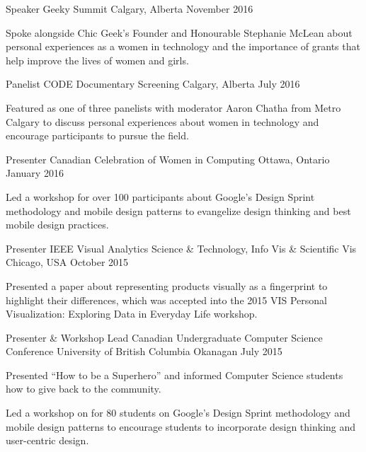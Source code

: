 \begin{cventries}
  \cventry
    {Speaker}
    {Geeky Summit}
    {Calgary, Alberta}
    {November 2016}
    {
      \begin{cvitems}
        \item {Spoke alongside Chic Geek's Founder and Honourable Stephanie McLean about personal experiences as a women in technology and the importance of grants that help improve the lives of women and girls.}
      \end{cvitems}
    }
  \cventry
    {Panelist}
    {CODE Documentary Screening}
    {Calgary, Alberta}
    {July 2016}
    {
      \begin{cvitems}
        \item {Featured as one of three panelists with moderator Aaron Chatha from Metro Calgary to discuss personal experiences about women in technology and encourage participants to pursue the field.}
      \end{cvitems}
    }
  \cventry
    {Presenter}
    {Canadian Celebration of Women in Computing}
    {Ottawa, Ontario}
    {January 2016}
    {
      \begin{cvitems}
        \item {Led a workshop for over 100 participants about Google's Design Sprint methodology and mobile design patterns to evangelize design thinking and best mobile design practices.}
      \end{cvitems}
    }
  \cventry
    {Presenter}
    {IEEE Visual Analytics Science \& Technology, Info Vis \& Scientific Vis}
    {Chicago, USA}
    {October 2015}
    {
      \begin{cvitems}
        \item {Presented a paper about representing products visually as a fingerprint to highlight their differences, which was accepted into the 2015 VIS Personal Visualization: Exploring Data in Everyday Life workshop.}
      \end{cvitems}
    }
  \cventry
    {Presenter \& Workshop Lead}
    {Canadian Undergraduate Computer Science Conference}
    {University of British Columbia Okanagan}
    {July 2015}
    {
      \begin{cvitems}
        \item {Presented ``How to be a Superhero'' and informed Computer Science students how to give back to the community.}
        \item {Led a workshop on for 80 students on Google's Design Sprint methodology and mobile design patterns to encourage students to incorporate design thinking and user-centric design.}
      \end{cvitems}
    }
\end{cventries}
